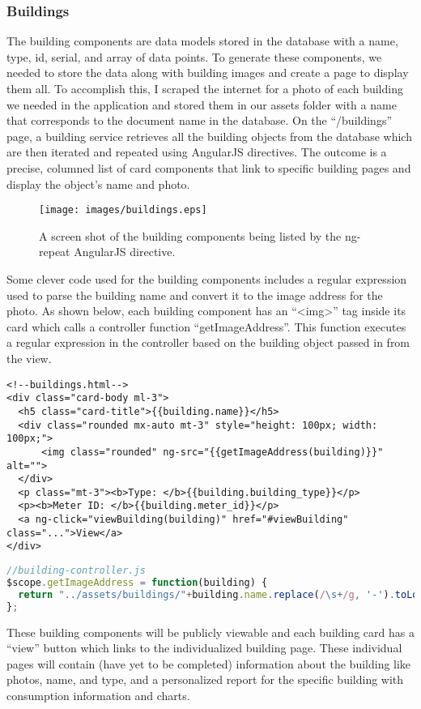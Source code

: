 \documentclass[letterpaper,10pt,serif,draftclsnofoot,onecolumn,compsoc,titlepage]{IEEEtran}
\begin{document}
\subsubsection{Buildings}
The building components are data models stored in the database with a name, type, id, serial, and array of data points. To generate these components, we needed to store the data along with building images and create a page to display them all. To accomplish this, I scraped the internet for a photo of each building we needed in the application and stored them in our assets folder with a name that corresponds to the document name in the database. On the ``/buildings'' page, a building service retrieves all the building objects from the database which are then iterated and repeated using AngularJS directives. The outcome is a precise, columned list of card components that link to specific building pages and display the object's name and photo. 
\begin{figure}[H]
  \centering
  \texttt{[image: images/buildings.eps]}
  \caption{A screen shot of the building components being listed by the ng-repeat AngularJS directive.}
\end{figure}
Some clever code used for the building components includes a regular expression used to parse the building name and convert it to the image address for the photo. As shown below, each building component has an ``\textless img\textgreater'' tag inside its card which calls a controller function ``getImageAddress''. This function executes a regular expression in the controller based on the building object passed in from the view.

\begin{lstlisting}[language=HTML5]
<!--buildings.html-->
<div class="card-body ml-3">
  <h5 class="card-title">{{building.name}}</h5>
  <div class="rounded mx-auto mt-3" style="height: 100px; width: 100px;">
      <img class="rounded" ng-src="{{getImageAddress(building)}}" alt="">
  </div>
  <p class="mt-3"><b>Type: </b>{{building.building_type}}</p>
  <p><b>Meter ID: </b>{{building.meter_id}}</p>
  <a ng-click="viewBuilding(building)" href="#viewBuilding" class="...">View</a>
</div>
\end{lstlisting}
\begin{lstlisting}[language=JavaScript]
//building-controller.js
$scope.getImageAddress = function(building) {
  return "../assets/buildings/"+building.name.replace(/\s+/g, '-').toLowerCase()+".jpg";
};
\end{lstlisting}
These building components will be publicly viewable and each building card has a ``view'' button which links to the individualized building page. These individual pages will contain (have yet to be completed) information about the building like photos, name, and type, and a personalized report for the specific building with consumption information and charts.
\end{document}
